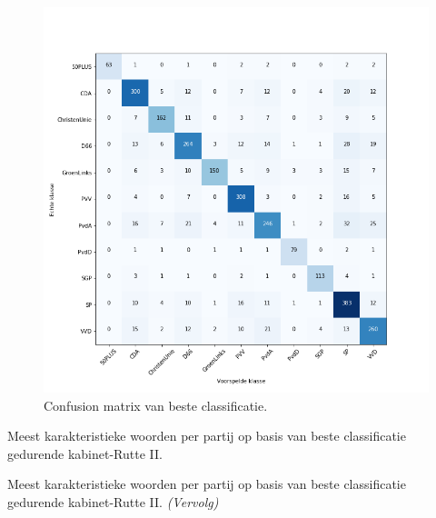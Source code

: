 \begin{figure}[H]
  \centering
    \includegraphics[width=0.60\paperwidth]{Verslag/Tables/confusionmatrix.png}
\caption{Confusion matrix van beste classificatie.}
\label{fig:confusionmatrix}
\end{figure}



\begin{table}[H]
\caption{Meest karakteristieke woorden per partij op basis van beste classificatie gedurende kabinet-Rutte II.} 

\label{tab:MostImportantWords} 
\centering
\hspace*{-1in}
 
\end{table} 
\addtocounter{table}{-1} 
\begin{table}[H]
\caption{Meest karakteristieke woorden per partij op basis van beste classificatie gedurende kabinet-Rutte II. \emph{(Vervolg)}} 
\centering
\hspace*{-1in}
 
\end{table}

